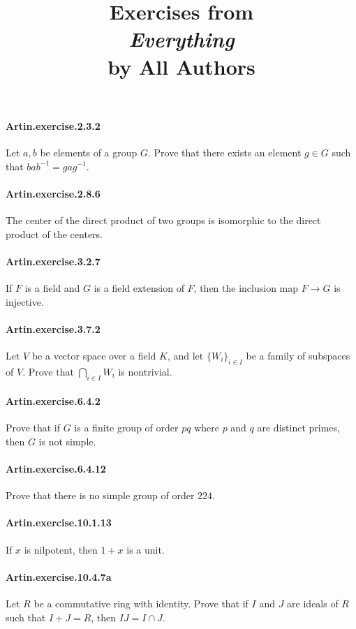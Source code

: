 \documentclass{article}
\title{\textbf{
Exercises from \\
\textit{Everything} \\
by All Authors
}}
\date{}
\begin{document}
\maketitle

\paragraph{Artin.exercise.2.3.2} Let $a, b$ be elements of a group $G$. Prove that there exists an element $g\in G$ such that $bab^{-1}=gag^{-1}$.

\paragraph{Artin.exercise.2.8.6} The center of the direct product of two groups is isomorphic to the direct product of the centers.

\paragraph{Artin.exercise.3.2.7} If $F$ is a field and $G$ is a field extension of $F$, then the inclusion map $F\to G$ is injective.

\paragraph{Artin.exercise.3.7.2} Let $V$ be a vector space over a field $K$, and let $\{W_i\}_{i\in I}$ be a family of subspaces of $V$. Prove that $\bigcap_{i\in I} W_i$ is nontrivial.

\paragraph{Artin.exercise.6.4.2} Prove that if $G$ is a finite group of order $pq$ where $p$ and $q$ are distinct primes, then $G$ is not simple.

\paragraph{Artin.exercise.6.4.12} Prove that there is no simple group of order $224$.

\paragraph{Artin.exercise.10.1.13} If $x$ is nilpotent, then $1+x$ is a unit.

\paragraph{Artin.exercise.10.4.7a} Let $R$ be a commutative ring with identity. Prove that if $I$ and $J$ are ideals of $R$ such that $I+J=R$, then $IJ=I\cap J$.
\end{document}

